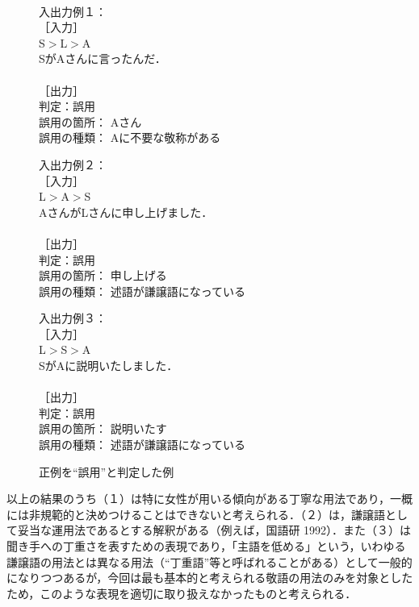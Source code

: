 \begin{figure}[htbp]
\begin{center}
\fbox
{
\begin{minipage}{65mm}
\baselineskip=4mm
　\\
入出力例１：\\
［入力］\\
S$>$L$>$A\\
SがAさんに言ったんだ．\\
　\\
［出力］\\
判定：誤用\\
誤用の箇所： Aさん\\
誤用の種類： Aに不要な敬称がある\\

\bigskip

入出力例２：\\
［入力］\\
L$>$A$>$S\\
AさんがLさんに申し上げました．\\
　\\
［出力］\\
判定：誤用\\
誤用の箇所： 申し上げる\\
誤用の種類： 述語が謙譲語になっている\\

\bigskip

入出力例３：\\
［入力］\\
L$>$S$>$A\\
SがAに説明いたしました．\\
　\\
［出力］\\
判定：誤用\\
誤用の箇所： 説明いたす\\
誤用の種類： 述語が謙譲語になっている\\
\end{minipage}
}
\caption{正例を``誤用''と判定した例}
\label{fig:figure7}
\end{center}
\end{figure}

\bigskip

以上の結果のうち（１）は特に女性が用いる傾向がある丁寧な用法であり，一概には非規範的と決めつけることはできないと考えられる．（２）は，謙譲語として妥当な運用法であるとする解釈がある（例えば，国語研 1992）．また（３）は聞き手への丁重さを表すための表現であり，「主語を低める」という，いわゆる謙譲語の用法とは異なる用法（``丁重語''等と呼ばれることがある）として一般的になりつつあるが，今回は最も基本的と考えられる敬語の用法のみを対象としたため，このような表現を適切に取り扱えなかったものと考えられる．

